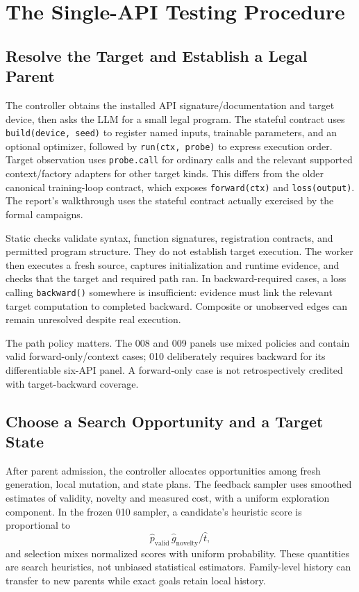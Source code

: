 \documentclass[conference]{IEEEtran}
\begin{document}
\section{The Single-API Testing Procedure}
\subsection{Resolve the Target and Establish a Legal Parent}
The controller obtains the installed API signature/documentation and target device, then asks the LLM for a small legal program. The stateful contract uses \texttt{build(device, seed)} to register named inputs, trainable parameters, and an optional optimizer, followed by \texttt{run(ctx, probe)} to express execution order. Target observation uses \texttt{probe.call} for ordinary calls and the relevant supported context/factory adapters for other target kinds. This differs from the older canonical training-loop contract, which exposes \texttt{forward(ctx)} and \texttt{loss(output)}. The report's walkthrough uses the stateful contract actually exercised by the formal campaigns.

Static checks validate syntax, function signatures, registration contracts, and permitted program structure. They do not establish target execution. The worker then executes a fresh source, captures initialization and runtime evidence, and checks that the target and required path ran. In backward-required cases, a loss calling \texttt{backward()} somewhere is insufficient: evidence must link the relevant target computation to completed backward. Composite or unobserved edges can remain unresolved despite real execution.

The path policy matters. The 008 and 009 panels use mixed policies and contain valid forward-only/context cases; 010 deliberately requires backward for its differentiable six-API panel. A forward-only case is not retrospectively credited with target-backward coverage.

\subsection{Choose a Search Opportunity and a Target State}
After parent admission, the controller allocates opportunities among fresh generation, local mutation, and state plans. The feedback sampler uses smoothed estimates of validity, novelty and measured cost, with a uniform exploration component. In the frozen 010 sampler, a candidate's heuristic score is proportional to
\begin{equation}
 \widehat p_{\mathrm{valid}}\,
 \widehat g_{\mathrm{novelty}}/\widehat t,
\end{equation}
and selection mixes normalized scores with uniform probability. These quantities are search heuristics, not unbiased statistical estimators. Family-level history can transfer to new parents while exact goals retain local history.
\end{document}
